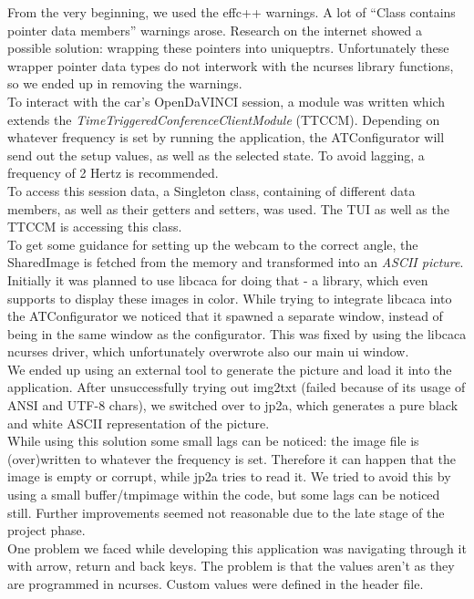 \noindent
From the very beginning, we used the effc++ warnings. A lot of ``Class contains
pointer data members'' warnings arose. Research on the internet showed a
possible solution: wrapping these pointers into unique\textunderscore ptrs.
Unfortunately these wrapper pointer data types do not interwork with the ncurses
library functions, so we ended up in removing the warnings.\\

\noindent
To interact with the car's OpenDaVINCI session, a module was written which
extends the \textit{TimeTriggeredConferenceClientModule} (TTCCM). Depending on
whatever frequency is set by running the application, the ATConfigurator will
send out the setup values, as well as the selected state. To avoid lagging, a
frequency of 2 Hertz is recommended.\\
To access this session data, a Singleton class, containing of different data
members, as well as their getters and setters, was used. The TUI as well as the
TTCCM is accessing this class.\\

\noindent
To get some guidance for setting up the webcam to the correct angle, the
SharedImage is fetched from the memory and transformed into an
\textit{ASCII picture}.
Initially it was planned to use libcaca for doing that - a library, which even
supports to display these images in color. While trying to integrate libcaca
into the ATConfigurator we noticed that it spawned a separate window, instead of
being in the same window as the configurator. This was fixed by using the
libcaca ncurses driver, which unfortunately overwrote also our main ui window.\\
We ended up using an external tool to generate the picture and load it into the
application. After unsuccessfully trying out img2txt (failed because of its
usage of ANSI and UTF-8 chars), we switched over to jp2a, which generates a pure
black and white ASCII representation of the picture.\\
While using this solution some small lags can be noticed: the image file is
(over)written to whatever the frequency is set. Therefore it can happen that the
image is empty or corrupt, while jp2a tries to read it. We tried to avoid this
by using a small buffer/tmpimage within the code, but some lags can be noticed
still. Further improvements seemed not reasonable due to the late stage of the
project phase.\\

\noindent
One problem we faced while developing this application was navigating through it
with arrow, return and back keys. The problem is that the values aren't as they
are programmed in ncurses. Custom values were defined in the header file.